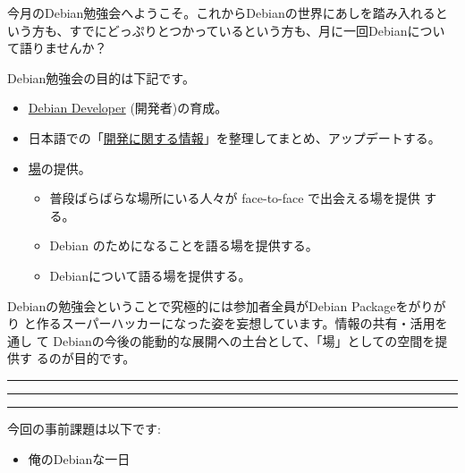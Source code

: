 \documentclass[mingoth,a4paper]{jsarticle}
\begin{document}
\begin{multicols}{2}
 

 今月のDebian勉強会へようこそ。これからDebianの世界にあしを踏み入れると
 いう方も、すでにどっぷりとつかっているという方も、月に一回Debianについ
 て語りませんか？

 Debian勉強会の目的は下記です。

 \begin{itemize}
 \item \underline{Debian Developer} (開発者)の育成。
 \item 日本語での「\underline{開発に関する情報}」を整理してまとめ、アップデートする。
 \item \underline{場}の提供。
 \begin{itemize}
  \item 普段ばらばらな場所にいる人々が face-to-face で出会える場を提供
	する。
  \item Debian のためになることを語る場を提供する。
  \item Debianについて語る場を提供する。
 \end{itemize}
 \end{itemize}		

 Debianの勉強会ということで究極的には参加者全員がDebian Packageをがりがり
 と作るスーパーハッカーになった姿を妄想しています。情報の共有・活用を通し
 て Debianの今後の能動的な展開への土台として、「場」としての空間を提供す
 るのが目的です。

\end{multicols}

\newpage

\begin{minipage}[b]{0.2\hsize}
 \colorbox{titleback}{}
\end{minipage}
\begin{minipage}[b]{0.8\hsize}
\hrule
\vspace{2mm}
\hrule
\begin{multicols}{2}
\tableofcontents
\end{multicols}
\vspace{2mm}
\hrule
\end{minipage}


今回の事前課題は以下です:

\begin{itemize}
 \item 俺のDebianな一日
\end{itemize}
\end{document}
